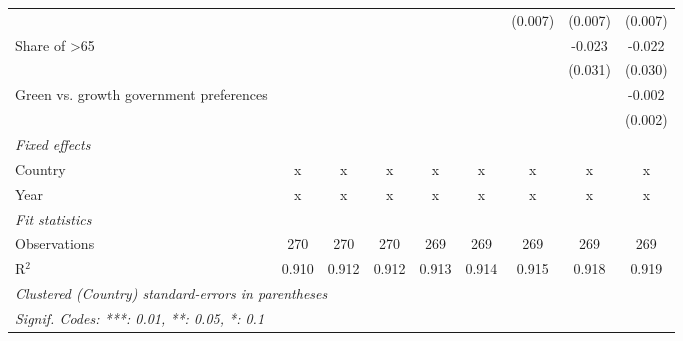 \begin{table}[htbp]
\begin{tabular}{lcccccccc}
                                                   &         &         &         &         &         & (0.007) & (0.007) & (0.007)\\   
      Share of >65                                 &         &         &         &         &         &         & -0.023  & -0.022\\   
                                                   &         &         &         &         &         &         & (0.031) & (0.030)\\   
      Green vs. growth government preferences      &         &         &         &         &         &         &         & -0.002\\   
                                                   &         &         &         &         &         &         &         & (0.002)\\   
      \emph{Fixed effects}\\
      Country                                      & x       & x       & x       & x       & x       & x       & x       & x\\  
      Year                                         & x       & x       & x       & x       & x       & x       & x       & x\\  
      \midrule \emph{Fit statistics}\\
      Observations                                 & 270     & 270     & 270     & 269     & 269     & 269     & 269     & 269\\  
      R$^2$                                        & 0.910   & 0.912   & 0.912   & 0.913   & 0.914   & 0.915   & 0.918   & 0.919\\  
      \midrule
      \multicolumn{9}{l}{\emph{Clustered (Country) standard-errors in parentheses}}\\
      \multicolumn{9}{l}{\emph{Signif. Codes: ***: 0.01, **: 0.05, *: 0.1}}\\
   \end{tabular}
\end{table}


